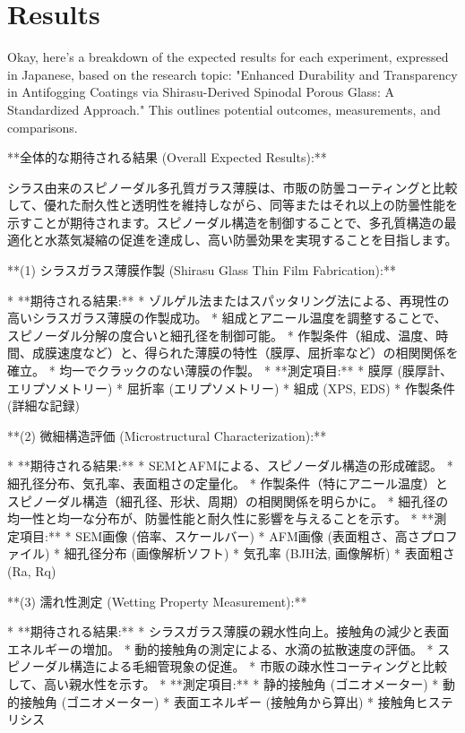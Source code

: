 \documentclass{article}
\begin{document}
\section{Results}
Okay, here's a breakdown of the expected results for each experiment, expressed in Japanese, based on the research topic: "Enhanced Durability and Transparency in Antifogging Coatings via Shirasu-Derived Spinodal Porous Glass: A Standardized Approach."  This outlines potential outcomes, measurements, and comparisons.

**全体的な期待される結果 (Overall Expected Results):**

シラス由来のスピノーダル多孔質ガラス薄膜は、市販の防曇コーティングと比較して、優れた耐久性と透明性を維持しながら、同等またはそれ以上の防曇性能を示すことが期待されます。スピノーダル構造を制御することで、多孔質構造の最適化と水蒸気凝縮の促進を達成し、高い防曇効果を実現することを目指します。

**(1) シラスガラス薄膜作製 (Shirasu Glass Thin Film Fabrication):**

*   **期待される結果:**
    *   ゾルゲル法またはスパッタリング法による、再現性の高いシラスガラス薄膜の作製成功。
    *   組成とアニール温度を調整することで、スピノーダル分解の度合いと細孔径を制御可能。
    *   作製条件（組成、温度、時間、成膜速度など）と、得られた薄膜の特性（膜厚、屈折率など）の相関関係を確立。
    *   均一でクラックのない薄膜の作製。
*   **測定項目:**
    *   膜厚 (膜厚計、エリプソメトリー)
    *   屈折率 (エリプソメトリー)
    *   組成 (XPS, EDS)
    *   作製条件 (詳細な記録)

**(2) 微細構造評価 (Microstructural Characterization):**

*   **期待される結果:**
    *   SEMとAFMによる、スピノーダル構造の形成確認。
    *   細孔径分布、気孔率、表面粗さの定量化。
    *   作製条件（特にアニール温度）とスピノーダル構造（細孔径、形状、周期）の相関関係を明らかに。
    *   細孔径の均一性と均一な分布が、防曇性能と耐久性に影響を与えることを示す。
*   **測定項目:**
    *   SEM画像 (倍率、スケールバー)
    *   AFM画像 (表面粗さ、高さプロファイル)
    *   細孔径分布 (画像解析ソフト)
    *   気孔率 (BJH法, 画像解析)
    *   表面粗さ (Ra, Rq)

**(3) 濡れ性測定 (Wetting Property Measurement):**

*   **期待される結果:**
    *   シラスガラス薄膜の親水性向上。接触角の減少と表面エネルギーの増加。
    *   動的接触角の測定による、水滴の拡散速度の評価。
    *   スピノーダル構造による毛細管現象の促進。
    *   市販の疎水性コーティングと比較して、高い親水性を示す。
*   **測定項目:**
    *   静的接触角 (ゴニオメーター)
    *   動的接触角 (ゴニオメーター)
    *   表面エネルギー (接触角から算出)
    *   接触角ヒステリシス
\end{document}
